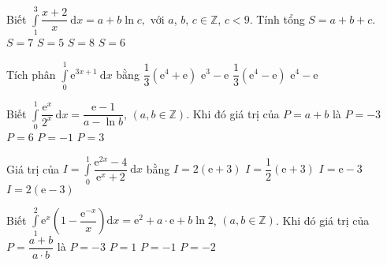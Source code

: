 \begin{ex}%
Biết $\displaystyle\int\limits_1^3\dfrac{x+2}{x}\mathrm{~d}x=a+b\ln c,$ với $a$, $b$, $c\in\mathbb{Z}$, $c<9.$ Tính tổng $S=a+b+c.$
\choice
{\True $ S=7$}
{$ S=5$}
{$ S=8$}
{$ S=6$}
\end{ex}
%
\begin{ex}%
Tích phân $\displaystyle\int\limits_0^1\mathrm{e}^{3x+1}\mathrm{~d}x$ bằng
\choice
{$\dfrac{1}{3}\left(\mathrm{e}^4+\mathrm{e}\right)$}
{$\mathrm{e}^3-\mathrm{e}$}
{\True $\dfrac{1}{3}\left(\mathrm{e}^4-\mathrm{e}\right)$}
{$\mathrm{e}^4-\mathrm{e}$}
\end{ex}

\begin{ex}%
Biết $\displaystyle\int\limits_0^1\dfrac{\mathrm{e}^x}{2^x}\mathrm{~d}x=\dfrac{\mathrm{e-1}}{a-\ln b }$, $\left(a,b\in\mathbb{Z}\right)$. Khi đó giá trị của $ P=a+b$ là
\choice
{$ P=-3$}
{\True $ P=6$}
{$ P=-1$}
{$ P=3$}
\end{ex}

\begin{ex}%
Giá trị của $ I=\displaystyle\int\limits_0^1\dfrac{\mathrm{e}^{2x}-4}{\mathrm{e}^x+2}\mathrm{~d}x$ bằng
\choice
{$ I=2\left(\mathrm{e}+3\right)$}
{$ I=\dfrac{1}{2}\left(\mathrm{e}+3\right)$}
{\True $ I=\mathrm{e}-3$}
{$ I=2\left(\mathrm{e}-3\right)$}
\end{ex}
%
\begin{ex}%
Biết $\displaystyle\int\limits_1^2\mathrm{e}^x\left(1-\dfrac{\mathrm{e}^{-x}}{x}\right)\mathrm{d}x=\mathrm{e}^2+a\cdot \mathrm{e}+b\ln 2$, $\left(a,b\in\mathbb{Z}\right)$. Khi đó giá trị của $ P=\dfrac{a+b}{a\cdot b}$ là
\choice
{$ P=-3$}
{$ P=1$}
{$ P=-1$}
{\True $ P=-2$}
\end{ex}


